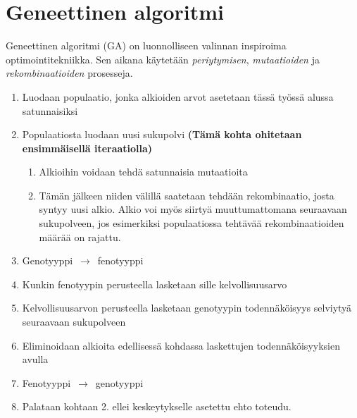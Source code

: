 \section{Geneettinen algoritmi}

Geneettinen algoritmi (GA) on luonnolliseen valinnan inspiroima optimointitekniikka.
Sen aikana käytetään \textit{periytymisen}, \textit{mutaatioiden} ja \textit{rekombinaatioiden}
prosesseja.

\begin{enumerate}
	\item Luodaan populaatio, jonka alkioiden arvot asetetaan tässä työssä alussa satunnaisiksi
	\item Populaatiosta luodaan uusi sukupolvi \textbf{(Tämä kohta ohitetaan ensimmäisellä iteraatiolla)}
	\begin{enumerate}
		\item Alkioihin voidaan tehdä satunnaisia mutaatioita
		\item Tämän jälkeen niiden välillä saatetaan tehdään rekombinaatio, josta syntyy uusi alkio.
		Alkio voi myös siirtyä muuttumattomana seuraavaan sukupolveen, jos esimerkiksi
		populaatiossa tehtävää rekombinaatioiden määrää on rajattu.
	\end{enumerate}
	\item Genotyyppi~\(\rightarrow\)~fenotyyppi
	\item	Kunkin fenotyypin perusteella lasketaan sille kelvollisuusarvo
	\item Kelvollisuusarvon perusteella lasketaan genotyypin todennäköisyys selviytyä seuraavaan sukupolveen
	\item Eliminoidaan alkioita edellisessä kohdassa laskettujen todennäköisyyksien avulla
	\item Fenotyyppi~\(\rightarrow\)~genotyyppi
	\item Palataan kohtaan 2. ellei keskeytykselle asetettu ehto toteudu.
\end{enumerate}

